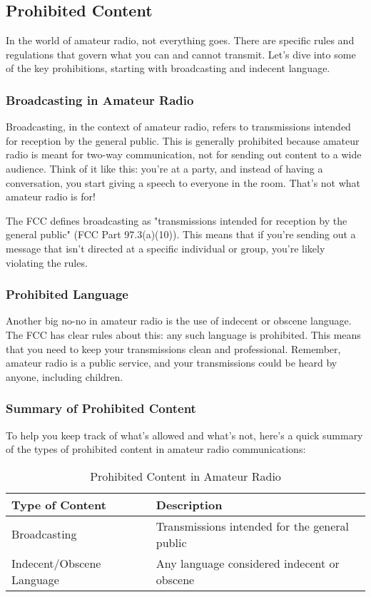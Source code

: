 \subsection{Prohibited Content}
\label{subsec:prohibited-content}

In the world of amateur radio, not everything goes. There are specific rules and regulations that govern what you can and cannot transmit. Let's dive into some of the key prohibitions, starting with broadcasting and indecent language.

\subsubsection*{Broadcasting in Amateur Radio}
Broadcasting, in the context of amateur radio, refers to transmissions intended for reception by the general public. This is generally prohibited because amateur radio is meant for two-way communication, not for sending out content to a wide audience. Think of it like this: you're at a party, and instead of having a conversation, you start giving a speech to everyone in the room. That's not what amateur radio is for!

The FCC defines broadcasting as "transmissions intended for reception by the general public" (FCC Part 97.3(a)(10)). This means that if you're sending out a message that isn't directed at a specific individual or group, you're likely violating the rules.

\subsubsection*{Prohibited Language}
Another big no-no in amateur radio is the use of indecent or obscene language. The FCC has clear rules about this: any such language is prohibited. This means that you need to keep your transmissions clean and professional. Remember, amateur radio is a public service, and your transmissions could be heard by anyone, including children.

\subsubsection*{Summary of Prohibited Content}
To help you keep track of what's allowed and what's not, here's a quick summary of the types of prohibited content in amateur radio communications:

\begin{table}[h]
\centering
\caption{Prohibited Content in Amateur Radio}
\label{tab:prohibited-content}
\begin{tabular}{|l|l|}
\hline
\textbf{Type of Content} & \textbf{Description} \\
\hline
Broadcasting & Transmissions intended for the general public \\
Indecent/Obscene Language & Any language considered indecent or obscene \\
\hline
\end{tabular}
\end{table}

